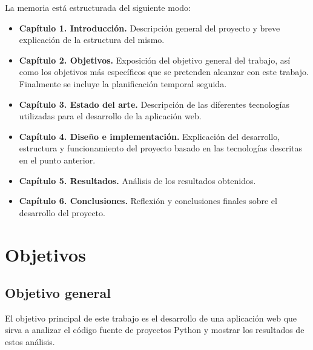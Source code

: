 \documentclass[a4paper, 12pt]{book}
\begin{document}
La memoria está estructurada del siguiente modo:

\begin{itemize}
  \item \textbf{Capítulo 1. Introducción.} Descripción general del proyecto y breve explicación de la estructura del mismo.
  
  \item \textbf{Capítulo 2. Objetivos.} Exposición del objetivo general del trabajo, así como los objetivos más específicos que se pretenden alcanzar con este trabajo. Finalmente se incluye la planificación temporal seguida.
  
  \item \textbf{Capítulo 3. Estado del arte.} Descripción de las diferentes tecnologías utilizadas para el desarrollo de la aplicación web.
  
  \item \textbf{Capítulo 4. Diseño e implementación.} Explicación del desarrollo, estructura y funcionamiento del proyecto basado en las tecnologías descritas en el punto anterior.

  \item \textbf{Capítulo 5. Resultados.} Análisis de los resultados obtenidos.

  \item \textbf{Capítulo 6. Conclusiones.} Reflexión y conclusiones finales sobre el desarrollo del proyecto.
\end{itemize}




\cleardoublepage
\chapter{Objetivos}
\label{chap:objetivos}

\section{Objetivo general}
\label{sec:objetivo-general}
El objetivo principal de este trabajo es el desarrollo de una aplicación web que sirva a analizar el código fuente de proyectos Python y mostrar los resultados de estos análisis.
\end{document}
